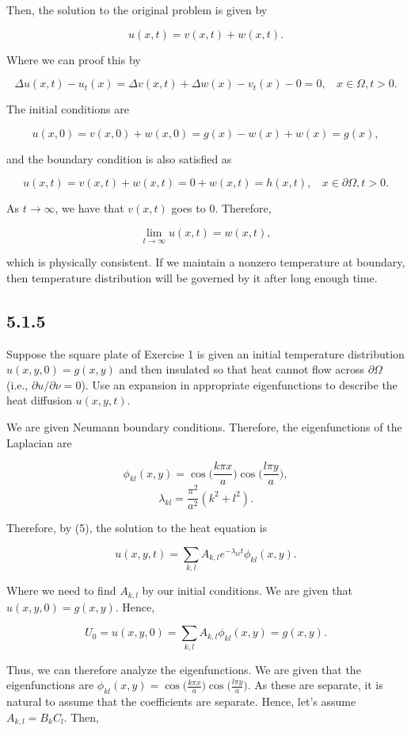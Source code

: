 \documentclass{article}
\begin{document}
Then, the solution to the original problem is given by

$$u(x,t)=v(x,t)+w(x,t).$$

Where we can proof this by

$$\Delta u(x,t)-u_t(x)=\Delta v(x,t) + \Delta w(x) - v_t(x) - 0 =0, ~~~~x\in\Omega, t>0.$$

The initial conditions are

$$u(x,0)=v(x,0)+w(x,0)=g(x)-w(x)+w(x)=g(x),$$

and the boundary condition is also satisfied as

$$u(x,t)=v(x,t)+w(x,t)=0+w(x,t)=h(x,t),~~~~x\in\partial\Omega, t>0.$$

As $t\to\infty$, we have that $v(x,t)$ goes to 0. Therefore,

$$\lim_{t\to\infty}u(x,t)=w(x,t),$$

which is physically consistent. If we maintain a nonzero temperature at boundary,
then temperature distribution will be governed by it after long enough time.

\subsection{\textbf{5.1.5}} Suppose the square plate of Exercise 1 is given an initial temperature distribution $u(x,y,0)=g(x,y)$ and then insulated so that heat cannot flow across $\partial\Omega$ (i.e., $\partial u / \partial\nu = 0$). Use an expansion in appropriate eigenfunctions to describe the heat diffusion $u(x,y,t)$.

We are given Neumann boundary conditions. Therefore, the eigenfunctions of the Laplacian are

$$\phi_{kl}(x,y)=\cos\Big(\frac{k\pi x}{a}\Big)\cos\Big(\frac{l\pi y}{a}\Big),$$
$$\lambda_{kl}=\frac{\pi^2}{a^2}\left(k^2+l^2\right).$$

Therefore, by (5), the solution to the heat equation is

$$u(x,y,t)=\sum_{k,l}A_{k,l}e^{-\lambda_{kl}t}\phi_{kl}(x,y).$$

Where we need to find $A_{k,l}$ by our initial conditions. We are given that $u(x,y,0)=g(x,y)$. Hence,

$$U_0=u(x,y,0)=\sum_{k,l}A_{k,l}\phi_{kl}(x,y)=g(x,y).$$

Thus, we can therefore analyze the eigenfunctions. We are given that the eigenfunctions are $\phi_{kl}(x,y)=\cos\Big(\frac{k\pi x}{a}\Big)\cos\Big(\frac{l\pi y}{a}\Big)$. As these are separate, it is natural to assume that the coefficients are separate. Hence, let's assume $A_{k,l}=B_kC_l$. Then,
\end{document}
